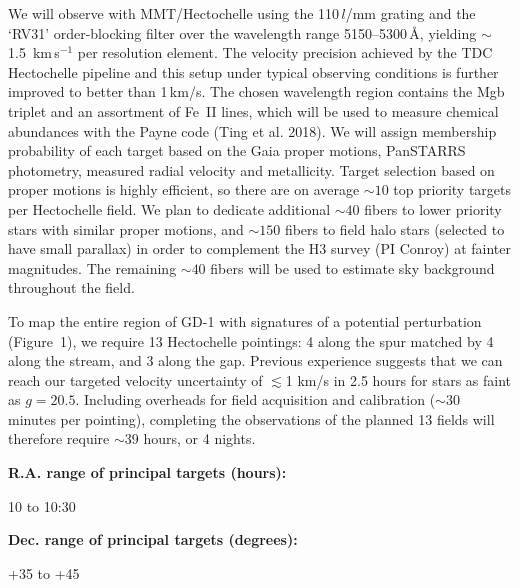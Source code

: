 \documentclass[12pt]{article}
\begin{document}
We will observe with MMT/Hectochelle using the 110\,$l$/mm grating and the `RV31' order-blocking filter over the wavelength range 5150--5300\,\AA, yielding $\sim$1.5~km\,s$^{-1}$ per resolution element.
The velocity precision achieved by the TDC Hectochelle pipeline and this setup under typical observing conditions is further improved to better than 1\,km/s.
The chosen wavelength region contains the Mgb triplet and an assortment of Fe~II lines, which will be used to measure chemical abundances with the Payne code (Ting et al. 2018).
We will assign membership probability of each target based on the Gaia proper motions, PanSTARRS photometry, measured radial velocity and metallicity.
Target selection based on proper motions is highly efficient, so there are on average $\sim10$ top priority targets per Hectochelle field.
We plan to dedicate additional $\sim40$ fibers to lower priority stars with similar proper motions, and $\sim150$ fibers to field halo stars (selected to have small parallax) in order to complement the H3 survey (PI Conroy) at fainter magnitudes.
The remaining $\sim40$ fibers will be used to estimate sky background throughout the field.

To map the entire region of GD-1 with signatures of a potential perturbation (Figure~1), we require 13 Hectochelle pointings: 4 along the spur matched by 4 along the stream, and 3 along the gap.
Previous experience suggests that we can reach our targeted velocity uncertainty of $\lesssim$1 km/s in 2.5 hours for stars as faint as $g=20.5$.
Including overheads for field acquisition and calibration ($\sim$30 minutes per pointing), completing the observations of the planned 13 fields will therefore require $\sim$39 hours, or 4 nights.

{\par\bf R.A. range of principal targets (hours): }10 to 10:30
{\par\bf Dec. range of principal targets (degrees): }+35 to +45

\pagebreak
\end{document}
